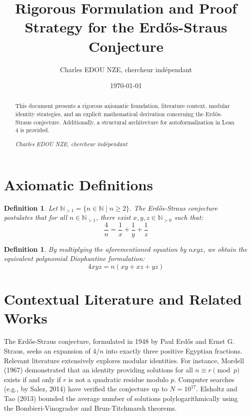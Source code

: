 \documentclass[11pt,a4paper]{article}
\title{Rigorous Formulation and Proof Strategy for the Erd\H{o}s-Straus Conjecture}
\author{Charles EDOU NZE, chercheur ind\'ependant}
\date{\today}
\newtheorem{definition}[theorem]{Definition}
\begin{document}
\maketitle

\begin{abstract}
This document presents a rigorous axiomatic foundation, literature context, modular identity strategies, and an explicit mathematical derivation concerning the Erd\H{o}s-Straus conjecture. Additionally, a structural architecture for autoformalization in Lean 4 is provided.

\vspace{2cm}
\begin{flushright}
\textit{Charles EDOU NZE, chercheur ind\'ependant}
\end{flushright}
\end{abstract}

\newpage

\section{Axiomatic Definitions}

\begin{definition}
Let $\mathbb{N}_{>1} = \{n \in \mathbb{N} \mid n \geq 2\}$. The Erd\H{o}s-Straus conjecture postulates that for all $n \in \mathbb{N}_{>1}$, there exist $x, y, z \in \mathbb{N}_{>0}$ such that:
\begin{equation}
\frac{4}{n} = \frac{1}{x} + \frac{1}{y} + \frac{1}{z}
\end{equation}
\end{definition}

\begin{definition}
By multiplying the aforementioned equation by $n x y z$, we obtain the equivalent polynomial Diophantine formulation:
\begin{equation}
4 x y z = n (x y + x z + y z)
\end{equation}
\end{definition}

\section{Contextual Literature and Related Works}

The Erd\H{o}s-Straus conjecture, formulated in 1948 by Paul Erd\H{o}s and Ernst G. Straus, seeks an expansion of $4/n$ into exactly three positive Egyptian fractions.
Relevant literature extensively explores modular identities. For instance, Mordell (1967) demonstrated that an identity providing solutions for all $n \equiv r \pmod p$ exists if and only if $r$ is not a quadratic residue modulo $p$.
Computer searches (e.g., by Salez, 2014) have verified the conjecture up to $N = 10^{17}$.
Elsholtz and Tao (2013) bounded the average number of solutions polylogarithmically using the Bombieri-Vinogradov and Brun-Titchmarsh theorems.
\end{document}
